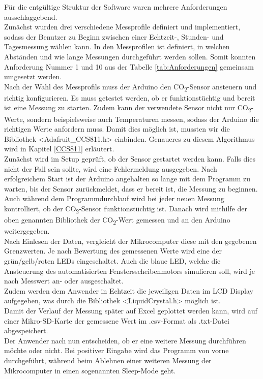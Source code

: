 \label{Softwaremplementation}



Für die entgültige Struktur der Software waren mehrere Anforderungen ausschlaggebend. \\
Zunächst wurden drei verschiedene Messprofile definiert und implementiert, sodass der Benutzer zu Beginn zwischen einer Echtzeit-, Stunden- und Tagesmessung wählen kann. In den Messprofilen ist definiert, in welchen Abständen und wie lange Messungen durchgeführt werden sollen. Somit konnten Anforderung Nummer 1 und 10 aus der Tabelle \ref{tab:Anforderungen} gemeinsam umgesetzt werden. \\
Nach der Wahl des Messprofils muss der Arduino den CO\textsubscript{2}-Sensor ansteuern und richtig konfigurieren. Es muss getestet werden, ob er funktionstüchtig und bereit ist eine Messung zu starten. Zudem kann der verwendete Sensor nicht nur CO\textsubscript{2}-Werte, sondern beispielsweise auch Temperaturen messen, sodass der Arduino die richtigen Werte anfordern muss. Damit dies möglich ist, mussten wir die Bibliothek <Adafruit\_CCS811.h> einbinden. Genaueres zu diesem Algorithmus wird in Kapitel \ref{CCS811} erläutert. \\
Zunächst wird im Setup geprüft, ob der Sensor gestartet werden kann. Falls dies nicht der Fall sein sollte, wird eine Fehlermeldung ausgegeben. Nach erfolgreichem Start ist der Arduino angehalten so lange mit dem Programm zu warten, bis der Sensor zurückmeldet, dass er bereit ist, die Messung zu beginnen. \\
Auch während dem Programmdurchlauf wird bei jeder neuen Messung kontrolliert, ob der CO\textsubscript{2}-Sensor funktionstüchtig ist. Danach wird mithilfe der oben genannten Bibliothek der CO\textsubscript{2}-Wert gemessen und an den Arduino weitergegeben. \\
Nach Einlesen der Daten, vergleicht der Mikrocomputer diese mit den gegebenen Grenzwerten. Je nach Bewertung des gemessenen Werte wird eine der grün/gelb/roten \ac{LED}s eingeschaltet. Auch die blaue \ac{LED}, welche die Ansteuerung des automatisierten Fenstersscheibenmotors simulieren soll, wird je nach Messwert an- oder ausgeschaltet. \\
Zudem werden dem Anwender in Echtzeit die jeweiligen Daten im \ac{LCD} Display aufgegeben, was durch die Bibliothek <LiquidCrystal.h> möglich ist. \\
Damit der Verlauf der Messung später auf Excel geplottet werden kann, wird auf einer Mikro-SD-Karte der gemessene Wert im .csv-Format als .txt-Datei abgespeichert. \\ %
Der Anwender nach nun entscheiden, ob er eine weitere Messung durchführen möchte oder nicht. Bei positiver Eingabe wird das Programm von vorne durchgeführt, während beim Ablehnen einer weiteren Messung der Mikrocomputer in einen sogenannten Sleep-Mode geht. %



